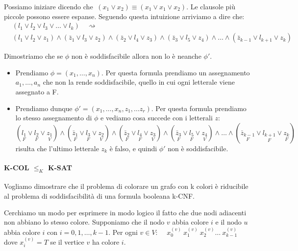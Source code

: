 \documentclass[a4paper]{article}
\theoremstyle{definition}
\begin{document}
			Possiamo iniziare dicendo che $ \ (x_1 \vee x_2) \equiv (x_1 \vee x_1 \vee x_2) $. Le clausole più piccole possono essere espanse. Seguendo questa intuizione arriviamo a dire che:
			\begin{align*}
				&(l_1 \vee l_2 \vee l_3 \vee \dots \vee l_k)\quad \rightsquigarrow\quad \\
				&(l_1\vee l_2\vee z_1) \wedge (\bar{z}_1\vee l_3 \vee z_2) \wedge (\bar{z}_2 \vee l_4\vee z_3)
				\wedge (\bar{z}_3 \vee l_5 \vee z_4) \wedge \dots \wedge (\bar{z}_{k-1} \vee l_{k+1} \vee z_k)
			\end{align*}
			
			Dimostriamo che se $ \phi $ non è soddisfacibile allora non lo è neanche $ \phi' $.
			\begin{itemize}
				\item Prendiamo $ \phi = (x_1 , \dots, x_n) $. Per questa formula prendiamo un assegnamento $ a_1, \dots, a_n $ che non la rende soddisfacibile, quello in cui ogni letterale viene assegnato a F.
				\item Prendiamo dunque $ \phi' = (x_1, \dots, x_n, z_1, \dots z_r) $. Per questa formula prendiamo lo stesso assegnamento di $ \phi $ e vediamo cosa succede con i letterali $ z $:
			\[
				(\underset{F}{l_1} \vee \underset{F}{l_2}\vee \underset{V}{z_1}) 
				\wedge (\underset{F}{\bar{z}_1}\vee \underset{F}{l_3} \vee \underset{V}{z_2}) 
				\wedge (\underset{F}{\bar{z}_2}\vee \underset{F}{l_4} \vee \underset{V}{z_3}) 
				\wedge (\underset{F}{\bar{z}_3}\vee \underset{F}{l_5} \vee \underset{V}{z_4})  \wedge 
				\dots \wedge (\underset{F}{\bar{z}_{k-1}}\vee \underset{F}{l_{k+1}} \vee \underset{F}{z_{k}}) 
			\]
			risulta che l'ultimo letterale $ z_k $ è falso, e quindi $ \phi' $ non è soddisfacibile.
 			\end{itemize}
 			
 			\paragraph{K-COL $ \leq_K $ K-SAT} Vogliamo dimostrare che il problema di colorare un grafo con k colori è riducibile al problema di soddisfacibilità di una formula booleana k-CNF.
 			
 			Cerchiamo un modo per esprimere in modo logico il fatto che due nodi adiacenti non abbiano lo stesso colore.
 			Supponiamo che il nodo $ v $ abbia colore $ i $ e il nodo $ u $ abbia colore $ i $ con $ i= 0,1, \dots, k-1 $.
 			Per ogni $ v \in V $: $ \quad x_0^{(v)} \ x_1^{(v)} \ x_2^{(v)} \dots \ x_{k-1}^{(v)}  $ dove $ x_i^{(v)} = T $ se il vertice $ v $ ha colore $ i $.
 			
\end{document}
